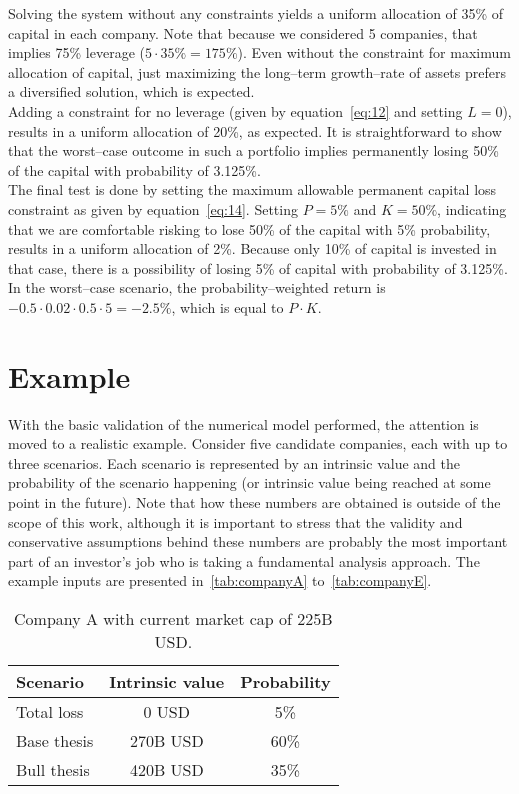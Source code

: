 \documentclass{article}
\begin{document}
\indent Solving the system without any constraints yields a uniform allocation
of 35\% of capital in each company. Note that because we considered 5 companies,
that implies 75\% leverage ($5 \cdot 35\% = 175\%$). Even without the
constraint for maximum allocation of capital, just maximizing the long--term
growth--rate of assets prefers a diversified solution, which is expected.\\

\indent Adding a constraint for no leverage (given by equation~\eqref{eq:12} and
setting $L = 0$), results in a uniform allocation of 20\%, as expected. It is
straightforward to show that the worst--case outcome in such a portfolio implies
permanently losing 50\% of the capital with probability of 3.125\%.\\

\indent The final test is done by setting the maximum allowable permanent
capital loss constraint as given by equation~\eqref{eq:14}. Setting $P = 5\%$
and $K = 50\%$, indicating that we are comfortable risking to lose 50\% of the
capital with 5\% probability, results in a uniform allocation of 2\%. Because
only 10\% of capital is invested in that case, there is a possibility of losing
5\% of capital with probability of 3.125\%. In the worst--case scenario, the
probability--weighted return is $-0.5 \cdot 0.02 \cdot 0.5 \cdot 5 = -2.5\%$,
which is equal to $P \cdot K$.

\section{Example}
\label{sec:example}

\noindent With the basic validation of the numerical model performed, the
attention is moved to a realistic example. Consider five candidate companies,
each with up to three scenarios. Each scenario is represented by an intrinsic
value and the probability of the scenario happening (or intrinsic value being
reached at some point in the future). Note that how these numbers are obtained
is outside of the scope of this work, although it is important to stress that
the validity and conservative assumptions behind these numbers are probably the
most important part of an investor's job who is taking a fundamental analysis
approach. The example inputs are presented in~\autoref{tab:companyA}
to~\autoref{tab:companyE}.

\begin{table}[!b]
\caption{Company A with current market cap of 225B USD.}
\vspace{0.25cm}
\centering
\begin{tabular}{l|c|c}
Scenario & Intrinsic value & Probability \\
\hline
Total loss & 0 USD & 5\% \\
Base thesis & 270B USD & 60\% \\
Bull thesis & 420B USD & 35\% \\
\end{tabular}%
\label{tab:companyA}%
\end{table}%
\end{document}
